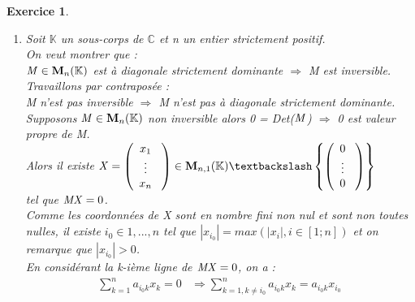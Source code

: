 \documentclass[a4paper,11pt]{article}
\newtheorem{exo}{Exercice}
\newcommand{\abs}[1]{\left\lvert#1\right\rvert}
\begin{document}
\begin{exo}
\begin{enumerate}
\begin{figure}[h]
\end{figure}
En représentant graphiquement les disques de Gerschgörin de la matrice A avec ses valeurs propres dans le plan complexe sur Scilab (probleme3.sce > valeurs\_propres(A)), on peut voir et vérifier que ces valeurs propres (en l'occurrence ses 3 valeurs propres) sont bien toutes dans l'union des disques (voir figure ci-dessus).
\item
Soit $\mathbb{K}$ un sous-corps de $\mathbb{C}$ et {\it n} un entier strictement positif. \ \\
On veut montrer que : \ \\
${\it M} \in {\bf M}_n(\mathbb{K})$ est à diagonale strictement dominante ${\Rightarrow}$  {\it M} est inversible. \ \\
Travaillons par contrapos\'{e}e : \ \\
{\it M} n'est pas inversible ${\Rightarrow}$ {\it M} n'est pas à diagonale strictement dominante. \ \\
Supposons ${\it M} \in {\bf M}_n(\mathbb{K})$ non inversible alors 0 = Det(${\it M}$) ${\Rightarrow}$ 0 est valeur propre de {\it M}. \ \\
Alors il existe $ {\it X} = \left( \begin{array}{cccc}
    x_1 \ \\
    \vdots \ \\
    x_n \ \\
   \end{array} \right) \in  {\bf M}_{n,1}(\mathbb{K}) \textbackslash \left\{\left(    \begin{array}{cccc}
    0 \ \\
    \vdots \ \\
    0 \ \\
   \end{array} \right)\right\} $  \ \\
tel que ${\it MX} = 0$. \ \\
Comme les coordonnées de {\it X} sont en nombre fini non nul et sont non toutes nulles, il existe $i_0 \in 1,...,n$ tel que $\abs{x_{i_0}} = max(\abs{x_i}, i \in [1;n])$ et on remarque que $\abs{x_{i_0}} > 0$. \ \\
En considérant la k-ième ligne de ${\it MX} = 0$, on a : \ \\
\begin{equation}
\begin{aligned}
\sum\limits_{k=1}^n a_{i_0k}x_k = 0 & \Rightarrow \sum\limits_{k=1,k\neq i_0}^n a_{i_0k}x_k = a_{i_0k}x_{i_0} \ \\

\end{aligned}
\end{equation}
\end{enumerate}
\end{exo}
\end{document}

